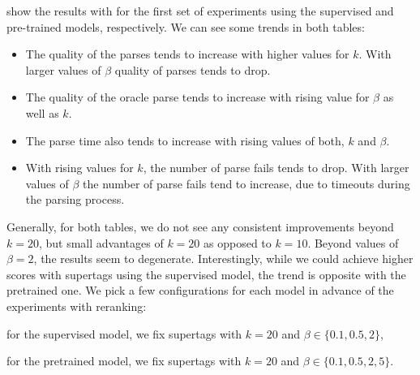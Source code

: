 \documentclass[../../document.tex]{subfiles}
\begin{document}
     show the results with for the first set of experiments using the supervised and pre-trained models, respectively.
    We can see some trends in both tables:
    \begin{itemize}
        \item The quality of the parses tends to increase with higher values for $k$.  With larger values of \(\beta\) quality of parses tends to drop.
        \item The quality of the oracle parse tends to increase with rising value for $\beta$ as well as \(k\).
        \item The parse time also tends to increase with rising values of both, \(k\) and \(\beta\).
        \item With rising values for $k$, the number of parse fails tends to drop. With larger values of \(\beta\) the number of parse fails tend to increase, due to timeouts during the parsing process.
    \end{itemize}
    Generally, for both tables, we do not see any consistent improvements beyond \(k=20\), but small advantages of \(k=20\) as opposed to \(k=10\).
    Beyond values of \(\beta = 2\), the results seem to degenerate.
    Interestingly, while we could achieve higher scores with  supertags using the supervised model, the trend is opposite with the pretrained one.
    We pick a few configurations for each model in advance of the experiments with reranking:
    \begin{compactitem}
        \item for the supervised model, we fix  supertags with \(k = 20\) and \(\beta \in \{0.1,0.5,2\}\),
        \item for the pretrained model, we fix  supertags with \(k = 20\) and \(\beta \in \{0.1,0.5,2,5\}\).
    \end{compactitem}
    
\end{document}
